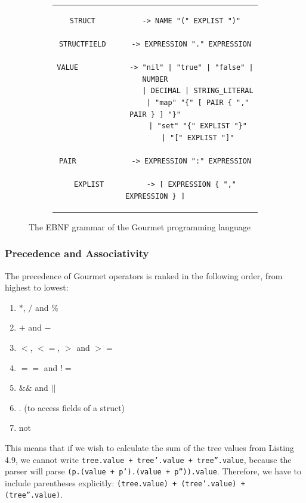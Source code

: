 \begin{figure}
    \begin{subfigure}[ht]{1\linewidth}
        \begin{tabular}{c}
            \begin{lstlisting}
STRUCT           -> NAME "(" EXPLIST ")"

STRUCTFIELD      -> EXPRESSION "." EXPRESSION

VALUE            -> "nil" | "true" | "false" | NUMBER
                    | DECIMAL | STRING_LITERAL
                    | "map" "{" [ PAIR { "," PAIR } ] "}"
                    | "set" "{" EXPLIST "}"
                    | "[" EXPLIST "]"

PAIR             -> EXPRESSION ":" EXPRESSION

EXPLIST          -> [ EXPRESSION { "," EXPRESSION } ]

            \end{lstlisting}
        \end{tabular}
    \end{subfigure}
    \setcounter{figure}{1}
    \caption{The EBNF grammar of the Gourmet programming language}
    \label{fig:gourmet-grammer1}
\end{figure}

\subsubsection{Precedence and Associativity}

The precedence of Gourmet operators is ranked in the following order, from highest to lowest:

\begin{enumerate}
    \item $*$, $/$ and $\%$
    \item $+$ and $-$
    \item $<$, $<=$, $>$ and $>=$
    \item $==$ and $!=$
    \item $\&\&$ and $||$
    \item $.$ (to access fields of a struct)
    \item not
\end{enumerate}

This means that if we wish to calculate the sum of the tree values from Listing 4.9, we cannot write \texttt{tree.value + tree'.value + tree''.value}, because the parser will parse \texttt{(p.(value + p').(value + p'')).value}. Therefore, we have to include parentheses explicitly: \texttt{(tree.value) + (tree'.value) + (tree''.value)}. \hfill \\

